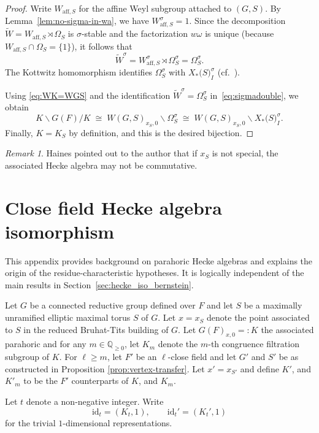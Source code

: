 \documentclass[american]{article}
\numberwithin{equation}{section}
\numberwithin{figure}{section}
\theoremstyle{plain}
\theoremstyle{definition}
\theoremstyle{remark}
\newtheorem{remark}[theorem]{Remark}
\newcommand{\id}{\mathrm{id}}
\begin{document}
\begin{proof}
Write \(W_{\mathrm{aff},S}\) for the affine Weyl subgroup attached to \((G,S)\). By Lemma~\ref{lem:no-sigma-in-wa},
we have \(W_{\mathrm{aff},S}^{\sigma}=1\).
Since the decomposition \(\widetilde W = W_{\mathrm{aff},S}\rtimes \Omega_S\) is \(\sigma\)-stable and the factorization
\(w\omega\) is unique (because \(W_{\mathrm{aff},S}\cap \Omega_S=\{1\}\)), it follows that
\[
\widetilde W^\sigma = W_{\mathrm{aff},S}^\sigma \rtimes \Omega_S^\sigma=\Omega_S^\sigma.
\]
The Kottwitz homomorphism identifies \(\Omega_S^{\sigma}\) with \(X_{*}\!\bigl(S\bigr)_{I}^{\sigma}\)
(cf.\ \cite[\S7]{Kot97}).

Using \eqref{eq:WK=WGS} and the identification \(\widetilde W^\sigma=\Omega_S^\sigma\) in~\eqref{eq:sigmadouble}, we obtain
\[
  K\backslash G(F)/K \;\cong\; W(G,S)_{x_S,0}\backslash \Omega_S^{\sigma}
  \;\cong\; W(G,S)_{x_S,0}\backslash X_{*}\!\bigl(S\bigr)_{I}^{\sigma}.
\]
Finally, \(K=K_S\) by definition, and this is the desired bijection.
\end{proof}

\begin{remark}
Haines pointed out to the author that if \(x_S\) is not special, the associated Hecke algebra may not be commutative.
\end{remark}



\section{Close field Hecke algebra isomorphism}
\label{app:kazhdan}

This appendix provides background on parahoric Hecke algebras and explains the origin of the
residue-characteristic hypotheses. It is logically independent of the main results in
Section~\ref{sec:hecke_iso_bernstein}.

Let $G$ be a connected reductive group defined over $F$ and let $S$ be a maximally unramified elliptic maximal torus $S$ of $G$. Let $x=x_S$ denote the point associated to $S$ in the reduced Bruhat-Tits building of $G$. Let $G(F)_{x,0}=:K$ the associated parahoric and for any $m\in \mathbb{Q}_{\geq 0}$, let $K_m $ denote the $m$-th congruence filtration subgroup of $K$. For $\ell \geq m$, let $F'$ be an $\ell$-close field and let $G'$ and $S'$ be as constructed in Proposition \ref{prop:vertex-transfer}. Let $x'=x_{S'}$ and define  $K'$, and $K'_m$ to be the $F'$ counterparts of  $K$, and $K_m$.

Let $t$ denote a non-negative integer. Write
\[
\id_t=(K_t,1), \qquad \id_t'=(K_t',1)
\]
for the trivial $1$-dimensional representations.
\end{document}
